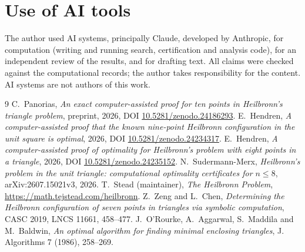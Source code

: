 \documentclass[11pt]{amsart}
\begin{document}
\section*{Use of AI tools}
The author used AI systems, principally Claude, developed by Anthropic, for computation (writing and running search, certification and analysis code), for an independent review of the results, and for drafting text. All claims were checked against the computational records; the author takes responsibility for the content. AI systems are not authors of this work.
\begin{thebibliography}{9}
 C.~Panorias, \emph{An exact computer-assisted proof for ten points in Heilbronn's triangle problem}, preprint, 2026, DOI \href{https://doi.org/10.5281/zenodo.24186293}{10.5281/zenodo.24186293}.
 E.~Hendren, \emph{A computer-assisted proof that the known nine-point Heilbronn configuration in the unit square is optimal}, 2026, DOI \href{https://doi.org/10.5281/zenodo.24234317}{10.5281/zenodo.24234317}.
 E.~Hendren, \emph{A computer-assisted proof of optimality for Heilbronn's problem with eight points in a triangle}, 2026, DOI \href{https://doi.org/10.5281/zenodo.24235152}{10.5281/zenodo.24235152}.
 N.~Sudermann-Merx, \emph{Heilbronn's problem in the unit triangle: computational optimality certificates for \(n\le8\)}, arXiv:2607.15021v3, 2026.
 T.~Stead (maintainer), \emph{The Heilbronn Problem}, \url{https://math.tejstead.com/heilbronn}.
 Z.~Zeng and L.~Chen, \emph{Determining the Heilbronn configuration of seven points in triangles via symbolic computation}, CASC 2019, LNCS 11661, 458--477.
 J.~O'Rourke, A.~Aggarwal, S.~Maddila and M.~Baldwin, \emph{An optimal algorithm for finding minimal enclosing triangles}, J. Algorithms 7 (1986), 258--269.
\end{thebibliography}
\end{document}
